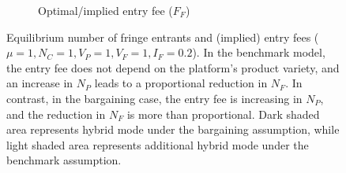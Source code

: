 \documentclass[a4paper]{article}
\begin{document}
\begin{figure}
\begin{subfigure}[b]{0.45\textwidth}
        \caption{Optimal/implied entry fee ($F_F$)}
        \label{fig:entry_fee}
    \end{subfigure}
    \caption{Equilibrium number of fringe entrants and (implied) entry fees ($\mu = 1, N_C = 1, V_P = 1, V_F = 1, I_F = 0.2$). In the benchmark model, the entry fee does not depend on the platform's product variety, and an increase in $N_P$ leads to a proportional reduction in $N_F$. In contrast, in the bargaining case, the entry fee is increasing in $N_P$, and the reduction in $N_F$ is more than proportional. Dark shaded area represents hybrid mode under the bargaining assumption, while light shaded area represents additional hybrid mode under the benchmark assumption.}
    \label{fig:entry_and_fees}
\end{figure}
\end{document}
